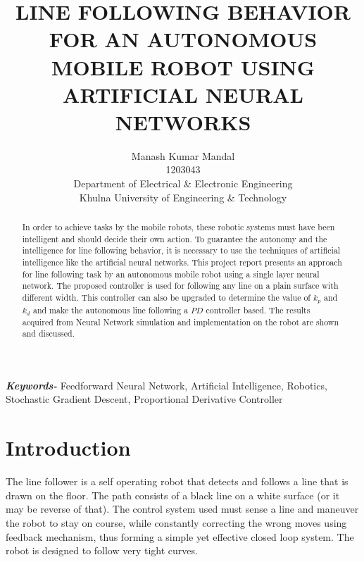 \documentclass[14pt, a4paper]{article}
\begin{document}
\title{LINE FOLLOWING BEHAVIOR FOR AN AUTONOMOUS MOBILE ROBOT USING ARTIFICIAL NEURAL NETWORKS}

\author{Manash Kumar Mandal\\ 1203043 \\ Department of Electrical \& Electronic Engineering \\ Khulna University of Engineering \& Technology}

\date{}

\maketitle
	

\tableofcontents

\newpage


\begin{abstract}

In order to achieve tasks by the mobile robots, these robotic systems must have been intelligent and should decide their own action. To guarantee the autonomy and the intelligence for line following behavior, it is necessary to use the techniques of artificial intelligence like the artificial neural networks. This project report presents an approach for line following task by an autonomous mobile robot using a single layer neural network. The proposed controller is used for following any line on a plain surface with different width. This controller can also be upgraded to determine the value of $k_{p}$ and $k_{d}$ and make the autonomous line following a $PD$ controller based. The results acquired from Neural Network simulation and implementation on the robot are shown and discussed.

\end{abstract}

\providecommand{\keywords}[1]{\textbf{\textit{Keywords-}} #1}

\keywords{Feedforward Neural Network, Artificial Intelligence, Robotics, Stochastic Gradient Descent, Proportional Derivative Controller}

\section{Introduction}

The line follower is a self operating robot that detects and follows a line that is drawn on the floor. The path consists of a black line on a white surface (or it may be reverse of that). The control system used must sense a line and maneuver the robot to stay on course, while constantly correcting the wrong moves using feedback mechanism, thus forming a simple yet effective closed loop system. The robot is designed to follow very tight curves. 
\end{document}
